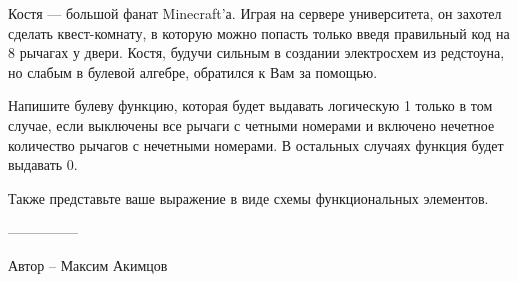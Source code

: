 \question
Костя — большой фанат Minecraft’а. Играя на сервере университета, он захотел сделать квест-комнату, в которую можно попасть только введя правильный код на 8 рычагах у двери. Костя, будучи сильным в создании электросхем из редстоуна, но слабым в булевой алгебре, обратился к Вам за помощью. 

Напишите булеву функцию, которая будет выдавать логическую 1 только в том случае, если выключены все рычаги с четными номерами и включено нечетное количество рычагов с нечетными номерами. В остальных случаях функция будет выдавать 0. 

Также представьте ваше выражение в виде схемы функциональных элементов.

---------------

Автор -- Максим Акимцов